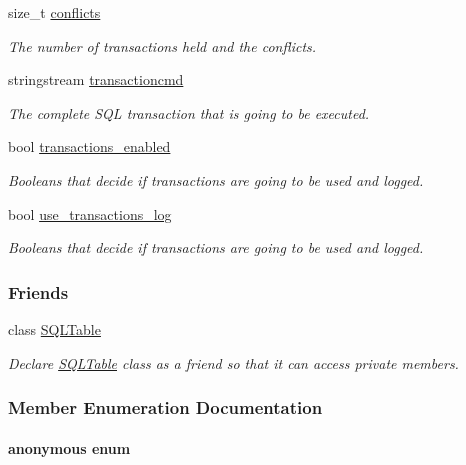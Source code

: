 \begin{CompactItemize}
size\_\-t \hyperlink{classSQLiteConnection_SQLiteConnectiono6}{conflicts}
\begin{CompactList}\small\item\em The number of transactions held and the conflicts.\item\end{CompactList}\item 
stringstream \hyperlink{classSQLiteConnection_SQLiteConnectiono7}{transactioncmd}
\begin{CompactList}\small\item\em The complete SQL transaction that is going to be executed.\item\end{CompactList}\item 
bool \hyperlink{classSQLiteConnection_SQLiteConnectiono8}{transactions\_\-enabled}
\begin{CompactList}\small\item\em Booleans that decide if transactions are going to be used and logged.\item\end{CompactList}\item 
bool \hyperlink{classSQLiteConnection_SQLiteConnectiono9}{use\_\-transactions\_\-log}
\begin{CompactList}\small\item\em Booleans that decide if transactions are going to be used and logged.\item\end{CompactList}\end{CompactItemize}
\subsubsection*{Friends}
\begin{CompactItemize}
\item 
class \hyperlink{classSQLiteConnection_SQLiteConnectionl0}{SQLTable}
\begin{CompactList}\small\item\em Declare \hyperlink{classSQLTable}{SQLTable} class as a friend so that it can access private members.\item\end{CompactList}\end{CompactItemize}


\subsubsection{Member Enumeration Documentation}
\hypertarget{classSQLiteConnection_SQLiteConnectionu4}{
\paragraph["@8]{\setlength{\rightskip}{0pt plus 5cm}anonymous enum}\hfill}
\label{classSQLiteConnection_SQLiteConnectionu4}


